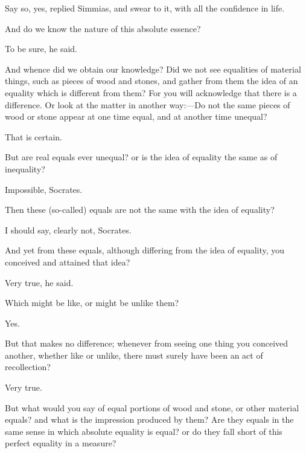 \documentclass[11pt,letter]{article}
\begin{document}
\par  Say so, yes, replied Simmias, and swear to it, with all the confidence in life.

\par  And do we know the nature of this absolute essence?

\par  To be sure, he said.

\par  And whence did we obtain our knowledge? Did we not see equalities of material things, such as pieces of wood and stones, and gather from them the idea of an equality which is different from them? For you will acknowledge that there is a difference. Or look at the matter in another way:—Do not the same pieces of wood or stone appear at one time equal, and at another time unequal?

\par  That is certain.

\par  But are real equals ever unequal? or is the idea of equality the same as of inequality?

\par  Impossible, Socrates.

\par  Then these (so-called) equals are not the same with the idea of equality?

\par  I should say, clearly not, Socrates.

\par  And yet from these equals, although differing from the idea of equality, you conceived and attained that idea?

\par  Very true, he said.

\par  Which might be like, or might be unlike them?

\par  Yes.

\par  But that makes no difference; whenever from seeing one thing you conceived another, whether like or unlike, there must surely have been an act of recollection?

\par  Very true.

\par  But what would you say of equal portions of wood and stone, or other material equals? and what is the impression produced by them? Are they equals in the same sense in which absolute equality is equal? or do they fall short of this perfect equality in a measure?
\end{document}
